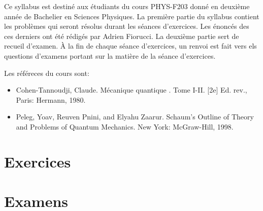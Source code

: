 \documentclass[a4paper,10pt]{book}
\begin{document}


\nocite{*}

\thispagestyle{plain}

Ce syllabus est destiné aux étudiants du cours PHYS-F203 donné en deuxième année de Bachelier en Sciences Physiques. La première partie du syllabus contient les problèmes qui seront résolus durant les séances d'exercices. Les énoncés des ces derniers ont été rédigés par Adrien Fiorucci. La deuxième partie sert de recueil d'examen. À la fin de chaque séance d'exercices, un renvoi est fait vers els questions d'examens portant sur la matière de la séance d'exercices.

Les référeces du cours sont: 
\begin{itemize}[label=\textbullet]
    \item Cohen-Tannoudji, Claude. Mécanique quantique . Tome I-II. [2e] Ed. rev., Paris: Hermann, 1980.
    \item Peleg, Yoav, Reuven Pnini, and Elyahu Zaarur. Schaum's Outline of Theory and Problems of Quantum Mechanics. New York: McGraw-Hill, 1998.
\end{itemize}

\vspace{17cm}



\pagebreak

\thispagestyle{plain}

\tableofcontents

\part{Exercices}

\makeatletter
\renewcommand{\@chapapp}{Séance}
\makeatother















\part{Examens}

\makeatletter
\renewcommand{\@chapapp}{Examen}
\makeatother
\end{document}
